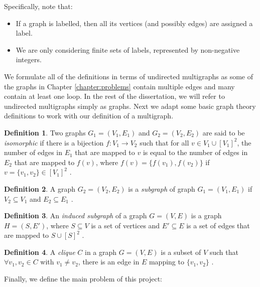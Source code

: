 \documentclass{l4proj}
\theoremstyle{definition}
\newtheorem{definition}{Definition}[chapter]
\theoremstyle{remark}
\begin{document}
Specifically, note that:

\begin{itemize}
\item If a graph is labelled, then all its vertices (and possibly edges) are
  assigned a label.
\item We are only considering finite sets of labels, represented by non-negative integers.
\end{itemize}

We formulate all of the definitions in terms of undirected multigraphs as some
of the graphs in Chapter \ref{chapter:problems} contain multiple edges and many
contain at least one loop. In the rest of the dissertation, we will refer to
undirected multigraphs simply as graphs. Next we adapt some basic graph theory
definitions to work with our definition of a multigraph.

\begin{definition}
  Two graphs $G_1 = (V_1, E_1)$ and $G_2 = (V_2, E_2)$ are said to be
  \emph{isomorphic} if there is a bijection $f \colon V_1 \to V_2$ such that
  for all $v \in V_1 \cup [V_1]^2$, the number of edges in $E_1$ that are mapped
  to $v$ is equal to the number of edges in $E_2$ that are mapped to $f(v)$,
  where $f(v) = \{ f(v_1), f(v_2) \}$ if $v = \{ v_1, v_2 \} \in [V_1]^2$
  \cite{DBLP:journals/jcamd/RaymondW02a}.
\end{definition}

\begin{definition} A graph $G_2 = (V_2, E_2)$ is a \emph{subgraph} of graph $G_1
  = (V_1, E_1)$ if $V_2 \subseteq V_1$ and $E_2 \subseteq E_1$
  \cite{DBLP:books/daglib/0030488}.
\end{definition}

\begin{definition} \label{def:induced_subgraph}
  An \emph{induced subgraph} of a graph $G = (V, E)$ is a graph $H = (S, E')$,
  where $S \subseteq V$ is a set of vertices and $E' \subseteq E$ is a set of
  edges that are mapped to $S \cup [S]^2$
  \cite{DBLP:journals/jcamd/RaymondW02a}.
\end{definition}

\begin{definition}
  A \emph{clique} $C$ in a graph $G = (V, E)$ is a subset of $V$ such that
  $\forall v_1, v_2 \in C$ with $v_1 \ne v_2$, there is an edge in $E$ mapping
  to $\{ v_1, v_2 \}$ \cite{DBLP:journals/jgo/PardalosX94a}.
\end{definition}

Finally, we define the main problem of this project:
\end{document}

